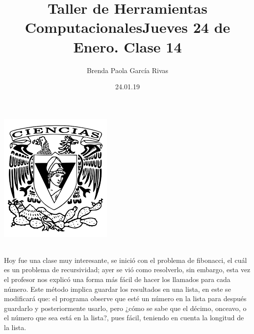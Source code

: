 \documentclass{article}
\title{\huge \color{purple}Taller de Herramientas Computacionales}
\author{Brenda Paola García Rivas}
\date{24.01.19}
\begin{document}
	\maketitle
	\begin{center}
		\includegraphics [scale=1.5]{1.png}
	\end{center}

	\newpage
	\title{\huge Jueves 24 de Enero. Clase 14}\\
	
	Hoy fue una clase muy interesante, se inició con el problema de fibonacci, el cuál es un problema de recursividad; ayer se vió como resolverlo, sin embargo, esta vez el profesor nos explicó una forma más fácil de hacer los llamados para cada número. 
	Este método implica guardar los resultados en una lista, en este se modificará que: el programa observe que esté un número en la lista para después guardarlo y posteriormente usarlo, pero ¿cómo se sabe que el décimo, onceavo, o el número que sea está en la lista?, pues fácil, teniendo en cuenta la longitud de la lista.
	
\end{document}
